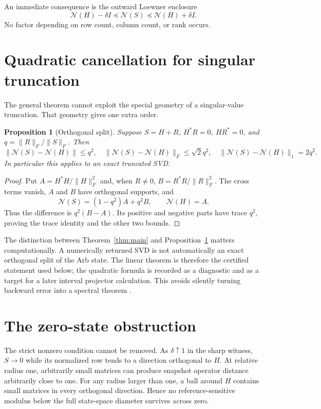 \documentclass[12pt]{article}
\newtheorem{proposition}[theorem]{Proposition}
\begin{document}
An immediate consequence is the outward Loewner enclosure
\[
 \mathcal N(H)-\delta I\preceq\mathcal N(S)
 \preceq\mathcal N(H)+\delta I.
\]
No factor depending on row count, column count, or rank occurs.

\section{Quadratic cancellation for singular truncation}
The general theorem cannot exploit the special geometry of a singular-value
truncation.  That geometry gives one extra order.

\begin{proposition}[Orthogonal split]\label{prop:svd}
Suppose $S=H+R$, $H^*R=0$, $HR^*=0$, and
$q=\|R\|_F/\|S\|_F$.  Then
\[
 \|\mathcal N(S)-\mathcal N(H)\|\leq q^2,
 \quad
 \|\mathcal N(S)-\mathcal N(H)\|_F\leq\sqrt2q^2,
 \quad
 \|\mathcal N(S)-\mathcal N(H)\|_1=2q^2.
\]
In particular this applies to an exact truncated SVD.
\end{proposition}

\begin{proof}
Put $A=H^*H/\|H\|_F^2$ and, when $R\ne0$,
$B=R^*R/\|R\|_F^2$.  The cross terms vanish, $A$ and $B$ have orthogonal
supports, and
\[
 \mathcal N(S)=(1-q^2)A+q^2B,
 \qquad \mathcal N(H)=A.
\]
Thus the difference is $q^2(B-A)$.  Its positive and negative parts have
trace $q^2$, proving the trace identity and the other two bounds.
\end{proof}

The distinction between Theorem~\ref{thm:main} and
Proposition~\ref{prop:svd} matters computationally.  A numerically returned
SVD is not automatically an exact orthogonal split of the Arb state.  The
linear theorem is therefore the certified statement used below; the
quadratic formula is recorded as a diagnostic and as a target for a later
interval projector calculation.  This avoids silently turning backward
error into a spectral theorem \citep{Wedin1972,Bhatia1997}.

\section{The zero-state obstruction}
The strict nonzero condition cannot be removed.  As $\delta\uparrow1$ in the
sharp witness, $S\to0$ while its normalized row tends to a direction
orthogonal to $H$.  At relative radius one, arbitrarily small matrices can
produce snapshot operator distance arbitrarily close to one.  For any radius
larger than one, a ball around $H$ contains small matrices in every
orthogonal direction.  Hence no reference-sensitive modulus below the full
state-space diameter survives across zero.
\end{document}
